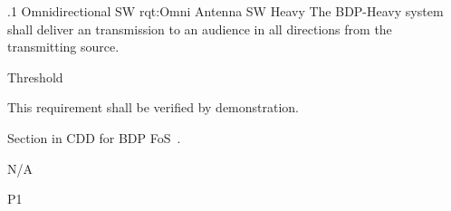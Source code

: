 
\ONERQMTVKPP
{\RqtNumberBase.1}
{Omnidirectional SW}
{rqt:Omni Antenna SW Heavy}
{The BDP-Heavy system shall deliver an \SW transmission to an audience in all directions from the transmitting source.}%
{
	\item [Phase 1] Threshold
}
{This requirement shall be verified by demonstration.}
{
\item [5.1.1] Section in CDD for BDP FoS~\cite{ref__BDP_FOS_CDD}.	
} 
{
	\item N/A
}
{P1}
